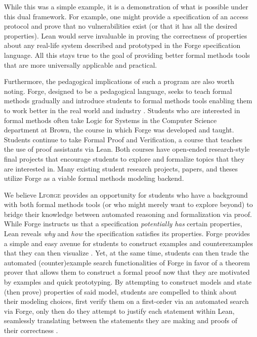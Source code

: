 While this was a simple example, it is a demonstration of what is possible under this dual framework. For example, one might provide a specification of an access protocol and prove that no vulnerabilities exist (or that it has all the desired properties). Lean would serve invaluable in proving the correctness of properties about any real-life system described and prototyped in the Forge specification language. All this stays true to the goal of providing better formal methods tools that are more universally applicable and practical. 

Furthermore, the pedagogical implications of such a program are also worth noting. Forge, designed to be a pedagogical language, seeks to teach formal methods gradually and introduce students to formal methods tools enabling them to work better in the real world and industry \cite{ngpdbccdlrrvwwk-oopsla-2024}. Students who are interested in formal methods often take Logic for Systems in the Computer Science department at Brown, the course in which Forge was developed and taught. Students continue to take Formal Proof and Verification, a course that teaches the use of proof assistants via Lean. Both courses have open-ended research-style final projects that encourage students to explore and formalize topics that they are interested in. Many existing student research projects, papers, and theses utilize Forge as a viable formal methods modeling backend. \cite{srajesh-honorsthesis,lzhu-honorsthesis}

We believe \textsc{Lforge} provides an opportunity for students who have a background with both formal methods tools (or who might merely want to explore beyond) to bridge their knowledge between automated reasoning and formalization via proof. While Forge instructs us that a specification \emph{potentially has} certain properties, Lean reveals \emph{why} and \emph{how} the specification satisfies its properties. Forge provides a simple and easy avenue for students to construct examples and counterexamples that they can then visualize \cite{ngpdbccdlrrvwwk-oopsla-2024}. Yet, at the same time, students can then trade the automated (counter)example search functionalities of Forge in favor of a theorem prover that allows them to construct a formal proof now that they are motivated by examples and quick prototyping. By attempting to construct models and state (then prove) properties of said model, students are compelled to think about their modeling choices, first verify them on a first-order via an automated search via Forge, only then do they attempt to justify each statement within Lean, seamlessly translating between the statements they are making and proofs of their correctness \cite{avigad2019learning}. 